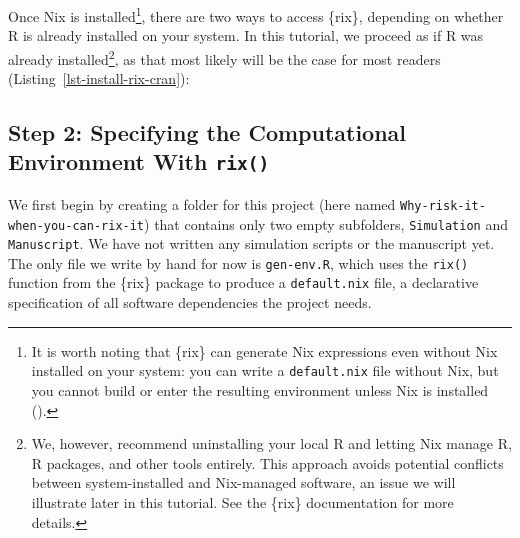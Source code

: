 \documentclass[
  man,
  longtable,
  nolmodern,
  notxfonts,
  notimes,
  colorlinks=true,linkcolor=blue,citecolor=blue,urlcolor=blue]{apa7}
\newenvironment{Shaded}{\begin{snugshade}}{\end{snugshade}}
\newcommand{\AttributeTok}[1]{\textcolor[rgb]{0.40,0.45,0.13}{#1}}
\newcommand{\CommentTok}[1]{\textcolor[rgb]{0.37,0.37,0.37}{#1}}
\newcommand{\FunctionTok}[1]{\textcolor[rgb]{0.28,0.35,0.67}{#1}}
\newcommand{\NormalTok}[1]{\textcolor[rgb]{0.00,0.23,0.31}{#1}}
\newcommand{\StringTok}[1]{\textcolor[rgb]{0.13,0.47,0.30}{#1}}
\begin{document}
Once Nix is installed\footnote{It is worth noting that \{rix\} can
  generate Nix expressions even without Nix installed on your system:
  you can write a \texttt{default.nix} file without Nix, but you cannot
  build or enter the resulting environment unless Nix is installed
  ().},
there are two ways to access \{rix\}, depending on whether R is already
installed on your system. In this tutorial, we proceed as if R was
already installed\footnote{We, however, recommend uninstalling your
  local R and letting Nix manage R, R packages, and other tools
  entirely. This approach avoids potential conflicts between
  system-installed and Nix-managed software, an issue we will illustrate
  later in this tutorial. See the \{rix\} documentation for more
  details.}, as that most likely will be the case for most readers
(Listing~\ref{lst-install-rix-cran}):

\begin{codelisting}

\caption{\label{lst-install-rix-cran}Installing \{rix\} From CRAN or
Development Version}

\centering{

\begin{Shaded}
\begin{Highlighting}[]
\CommentTok{\# CRAN version}
\FunctionTok{install.packages}\NormalTok{(}\StringTok{"rix"}\NormalTok{)}
\CommentTok{\# Development version}
\FunctionTok{install.packages}\NormalTok{(}
  \StringTok{"rix"}\NormalTok{,}
  \AttributeTok{repos =} \FunctionTok{c}\NormalTok{(}
    \StringTok{"https://ropensci.r{-}universe.dev"}
\NormalTok{  )}
\NormalTok{)}
\end{Highlighting}
\end{Shaded}

}

\end{codelisting}%

\subsection{\texorpdfstring{Step 2: Specifying the Computational
Environment With
\texttt{rix()}}{Step 2: Specifying the Computational Environment With rix()}}\label{sec-specifying-environment}

We first begin by creating a folder for this project (here named
\texttt{Why-risk-it-when-you-can-rix-it}) that contains only two empty
subfolders, \texttt{Simulation} and \texttt{Manuscript}. We have not
written any simulation scripts or the manuscript yet. The only file we
write by hand for now is \texttt{gen-env.R}, which uses the
\texttt{rix()} function from the \{rix\} package to produce a
\texttt{default.nix} file, a declarative specification of all software
dependencies the project needs.
\end{document}
